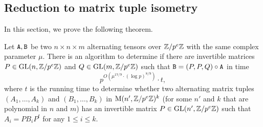 \subsection{Reduction to matrix tuple isometry}\label{sec:tensor_iso_to_matrix_tuple}

In this section, we prove the following theorem. 



\begin{theorem}\label{thm:tensor_iso_algo}
Let $\mathtt{A}, \mathtt{B}$ be two $n \times n \times m$ alternating tensors over $\mathbb{Z} / p^e \mathbb{Z}$ with the same complex parameter $\mu$. 
There is an algorithm to determine if 
there are invertible matrices $P \in \mathrm{GL}(n, \mathbb{Z} / p^e \mathbb{Z})$ and $Q \in \mathrm{GL}(m, \mathbb{Z} / p^e \mathbb{Z})$ such that 
$\mathtt{B} = (P, P, Q) \circ \mathtt{A}$ in time 
\[p^{O(\mu^{17 / 9} \cdot (\log p)^{8/9})} \cdot t,\]
where $t$ is the running time to determine whether two alternating matrix tuples $(A_1, \dots, A_k)$ and $(B_1, \dots, B_k)$ in $\mathrm{M}(n', \mathbb{Z} / p^e \mathbb{Z})^{k}$ (for some $n'$ and $k$ that are polynomial in $n$ and $m$) has an invertible matrix $P \in \mathrm{GL}(n', \mathbb{Z} / p^e \mathbb{Z})$ such that $A_i = P B_i P^t$ for any $1 \leq i \leq k$.
\end{theorem}

